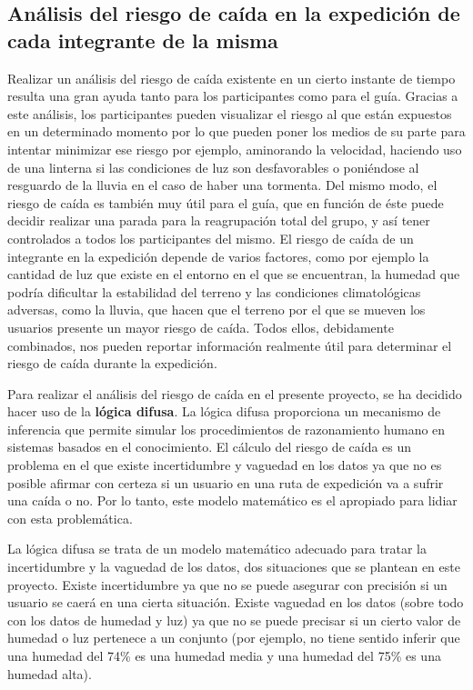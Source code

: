 \subsection{Análisis del riesgo de caída en la expedición de cada integrante de la misma}
\label{analysis_risk}

Realizar un análisis del riesgo de caída existente en un cierto instante de tiempo resulta una gran ayuda tanto para los participantes como para el guía. Gracias a este análisis, los participantes pueden visualizar el riesgo al que están expuestos en un determinado momento por lo que pueden poner los medios de su parte para intentar minimizar ese riesgo por ejemplo, aminorando la velocidad, haciendo uso de una linterna si las condiciones de luz son desfavorables o poniéndose al resguardo de la lluvia en el caso de haber una tormenta. Del mismo modo, el riesgo de caída es también muy útil para el guía, que en función de éste puede decidir realizar una parada para la reagrupación total del grupo, y así tener controlados a todos los participantes del mismo. El riesgo de caída de un integrante en la expedición depende de varios factores, como por ejemplo la cantidad de luz que existe en el entorno en el que se encuentran, la humedad que podría dificultar la estabilidad del terreno y las condiciones climatológicas adversas, como la lluvia, que hacen que el terreno por el que se mueven los usuarios presente un mayor riesgo de caída. Todos ellos, debidamente combinados, nos pueden reportar información realmente útil para determinar el riesgo de caída durante la expedición.

Para realizar el análisis del riesgo de caída en el presente proyecto, se ha decidido hacer uso de la \textbf{lógica difusa}. La lógica difusa \cite{43} proporciona un mecanismo de inferencia que permite simular los procedimientos de razonamiento humano en sistemas basados en el conocimiento. El cálculo del riesgo de caída es un problema en el que existe incertidumbre y vaguedad en los datos ya que no es posible afirmar con certeza si un usuario en una ruta de expedición va a sufrir una caída o no. Por lo tanto, este modelo matemático es el apropiado para lidiar con esta problemática.

La lógica difusa se trata de un modelo matemático adecuado para tratar la incertidumbre y la vaguedad de los datos, dos situaciones que se plantean en este proyecto. Existe incertidumbre ya que no se puede asegurar con precisión si un usuario se caerá en una cierta situación. Existe vaguedad en los datos (sobre todo con los datos de humedad y luz) ya que no se puede precisar si un cierto valor de humedad o luz pertenece a un conjunto (por ejemplo, no tiene sentido inferir que una humedad del 74\% es una humedad media y una humedad del 75\% es una humedad alta).

